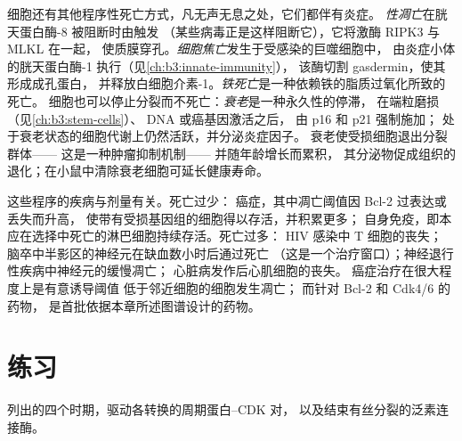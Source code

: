 \begin{definition}[调控性坏死与衰老]\label{def:b3:cell-cycle-apoptosis:other}
细胞还有其他程序性死亡方式，凡无声无息之处，它们都伴有炎症。
\emph{性凋亡}在胱天蛋白酶-8 被阻断时由触发
（某些病毒正是这样阻断它），它将激酶 RIPK3 与 MLKL 在一起，
使质膜穿孔。\emph{细胞焦亡}发生于受感染的巨噬细胞中，
由炎症小体的胱天蛋白酶-1 执行（见\cref{ch:b3:innate-immunity}），
该酶切割 gasdermin，使其形成成孔蛋白，
并释放白细胞介素-1。\emph{铁死亡}是一种依赖铁的脂质过氧化所致的死亡。
细胞也可以停止分裂而不死亡：\emph{衰老}是一种永久性的停滞，
在端粒磨损（见\cref{ch:b3:stem-cells}）、 DNA 或癌基因激活之后，
由 p16 和 p21 强制施加；
处于衰老状态的细胞代谢上仍然活跃，并分泌炎症因子。
衰老使受损细胞退出分裂群体——
这是一种肿瘤抑制机制——
并随年龄增长而累积，
其分泌物促成组织的退化；在小鼠中清除衰老细胞可延长健康寿命。
\end{definition}

\begin{remark}[过少与过多]\label{rem:b3:cell-cycle-apoptosis:disease}
这些程序的疾病与剂量有关。死亡过少：
癌症，其中凋亡阈值因 Bcl-2 过表达或  丢失而升高，
使带有受损基因组的细胞得以存活，并积累更多；
自身免疫，即本应在选择中死亡的淋巴细胞持续存活。死亡过多：
HIV 感染中 T 细胞的丧失；
脑卒中半影区的神经元在缺血数小时后通过死亡
（这是一个治疗窗口）；神经退行性疾病中神经元的缓慢凋亡；
心脏病发作后心肌细胞的丧失。
癌症治疗在很大程度上是有意诱导阈值
低于邻近细胞的细胞发生凋亡；
而针对 Bcl-2 和 Cdk4/6 的药物，
是首批依据本章所述图谱设计的药物。
\end{remark}

\section{练习}

\begin{exercise}[$\star$]\label{exo:b3:cell-cycle-apoptosis:1}
列出的四个时期，驱动各转换的周期蛋白--CDK 对，
以及结束有丝分裂的泛素连接酶。
\end{exercise}

